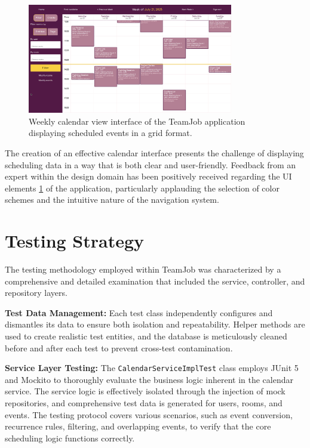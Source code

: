 \begin{figure}[htbp]
    \centering
    \includegraphics[width=0.8\textwidth]{Week_view}
    \caption{Weekly calendar view interface of the TeamJob application displaying scheduled events in a grid format.}
    \label{fig:week-view}
\end{figure}

The creation of an effective calendar interface presents the challenge of displaying scheduling data in a way that is both clear and user-friendly.
Feedback from an expert within the design domain has been positively received regarding the UI elements \ref{fig:week-view} of the application, particularly applauding the selection of color schemes and the intuitive nature of the navigation system.


\section{Testing Strategy}\label{sec:testing-strategy}
The testing methodology employed within TeamJob was characterized by a comprehensive and detailed examination that included the service, controller, and repository layers.

\textbf{Test Data Management:} Each test class independently configures and dismantles its data to ensure both isolation and repeatability.
Helper methods are used to create realistic test entities, and the database is meticulously cleaned before and after each test to prevent cross-test contamination.

\textbf{Service Layer Testing:} The \texttt{CalendarServiceImplTest} class employs JUnit 5 and Mockito to thoroughly evaluate the business logic inherent in the calendar service.
The service logic is effectively isolated through the injection of mock repositories, and comprehensive test data is generated for users, rooms, and events.
The testing protocol covers various scenarios, such as event conversion, recurrence rules, filtering, and overlapping events, to verify that the core scheduling logic functions correctly.

